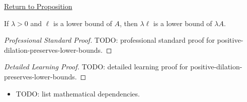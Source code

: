 \newpage
{}
\label{prf:positive-dilation-preserves-lower-bounds}

\begin{remark*}[Return]
\hyperref[prop:positive-dilation-preserves-lower-bounds]{Return to Proposition}
\end{remark*}

\begin{proposition*}
If $\lambda>0$ and $\ell$ is a lower bound of $A$, then $\lambda\ell$ is a
lower bound of $\lambda A$.
\end{proposition*}

\begin{proof}[Professional Standard Proof]
\LRAProofBodyStart
TODO: professional standard proof for positive-dilation-preserves-lower-bounds.
\end{proof}

\begin{proof}[Detailed Learning Proof]
\LRAProofBodyStart
TODO: detailed learning proof for positive-dilation-preserves-lower-bounds.
\end{proof}

\begin{remark*}
\end{remark*}

\begin{dependencies}
\begin{itemize}
  \item TODO: list mathematical dependencies.
\end{itemize}
\end{dependencies}

\clearpage
